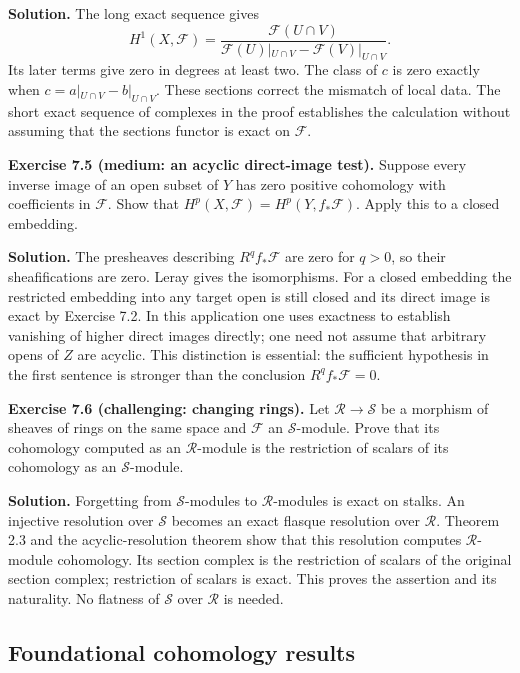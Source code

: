\documentclass[11pt]{article}
\begin{document}
\textbf{Solution.} The long exact sequence gives \[
H^1(X,\mathcal F)=\frac{\mathcal F(U\cap V)}{\mathcal F(U)|_{U\cap V}-\mathcal F(V)|_{U\cap V}}.
\] Its later terms give zero in degrees at least two. The class of \(c\)
is zero exactly when \(c=a|_{U\cap V}-b|_{U\cap V}\). These sections
correct the mismatch of local data. The short exact sequence of
complexes in the proof establishes the calculation without assuming that
the sections functor is exact on \(\mathcal F\).

\textbf{Exercise 7.5 (medium: an acyclic direct-image test).} Suppose
every inverse image of an open subset of \(Y\) has zero positive
cohomology with coefficients in \(\mathcal F\). Show that
\(H^p(X,\mathcal F)=H^p(Y,f_*\mathcal F)\). Apply this to a closed
embedding.

\textbf{Solution.} The presheaves describing \(R^qf_*\mathcal F\) are
zero for \(q>0\), so their sheafifications are zero. Leray gives the
isomorphisms. For a closed embedding the restricted embedding into any
target open is still closed and its direct image is exact by Exercise
7.2. In this application one uses exactness to establish vanishing of
higher direct images directly; one need not assume that arbitrary opens
of \(Z\) are acyclic. This distinction is essential: the sufficient
hypothesis in the first sentence is stronger than the conclusion
\(R^qf_*\mathcal F=0\).

\textbf{Exercise 7.6 (challenging: changing rings).} Let
\(\mathcal R\to\mathcal S\) be a morphism of sheaves of rings on the
same space and \(\mathcal F\) an \(\mathcal S\)-module. Prove that its
cohomology computed as an \(\mathcal R\)-module is the restriction of
scalars of its cohomology as an \(\mathcal S\)-module.

\textbf{Solution.} Forgetting from \(\mathcal S\)-modules to
\(\mathcal R\)-modules is exact on stalks. An injective resolution over
\(\mathcal S\) becomes an exact flasque resolution over \(\mathcal R\).
Theorem 2.3 and the acyclic-resolution theorem show that this resolution
computes \(\mathcal R\)-module cohomology. Its section complex is the
restriction of scalars of the original section complex; restriction of
scalars is exact. This proves the assertion and its naturality. No
flatness of \(\mathcal S\) over \(\mathcal R\) is needed.

\subsection{Foundational cohomology
results}\label{foundational-cohomology-results}
\end{document}
